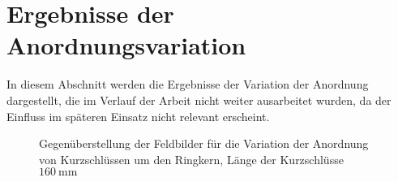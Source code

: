\section{Ergebnisse der Anordnungsvariation}\label{anhang:Anordnung}
In diesem Abschnitt werden die Ergebnisse der Variation der Anordnung dargestellt, die im Verlauf der Arbeit nicht weiter ausarbeitet wurden, da der Einfluss im späteren Einsatz nicht relevant erscheint.
\begin{figure}[htb]
    \centering
    
    \caption{Gegen\"uberstellung der Feldbilder für die Variation der Anordnung von Kurzschlüssen um den Ringkern, Länge der Kurzschlüsse $\SI{160}{\milli\meter}$}
    \label{fig:fieldAnordnung}
\end{figure}
